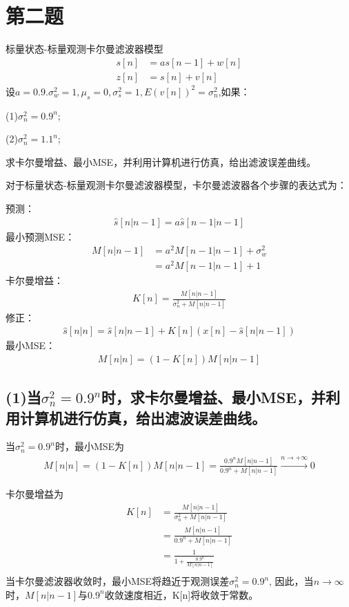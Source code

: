 \documentclass[fontset=windows]{article}
\numberwithin{figure}{section}
\begin{document}
\section{第二题}
标量状态-标量观测卡尔曼滤波器模型
\begin{align*}
    s[n] & =as[n-1]+w[n] \\
    z[n] & =s[n]+v[n]
\end{align*}
设\(a=0.9.\sigma_w^2=1,\mu_s=0,\sigma_s^2=1,E(v[n])^2=\sigma_n^2\),如果：

(1)\(\sigma_n^2=0.9^n\);

(2)\(\sigma_n^2=1.1^n\);

求卡尔曼增益、最小MSE，并利用计算机进行仿真，给出滤波误差曲线。

对于标量状态-标量观测卡尔曼滤波器模型，卡尔曼滤波器各个步骤的表达式为：

预测：
\begin{align*}
    \hat{s}[n|n-1] =a\hat{s}[n-1|n-1]
\end{align*}
最小预测MSE：
\begin{align*}
    M[n|n-1] & =a^2M[n-1|n-1]+\sigma_w^2 \\
             & =a^2M[n-1|n-1]+1
\end{align*}
卡尔曼增益：
\begin{align*}
    K[n]         =\frac{M[n|n-1]}{\sigma_n^2+M[n|n-1]}
\end{align*}
修正：
\begin{align*}
    \hat{s}[n|n] =\hat{s}[n|n-1]+K[n](x[n]-\hat{s}[n|n-1])
\end{align*}
最小MSE：
\begin{align*}
    M[n|n]       =(1-K[n])M[n|n-1]
\end{align*}

\subsection*{(1)当\(\sigma_n^2=0.9^n\)时，求卡尔曼增益、最小MSE，并利用计算机进行仿真，给出滤波误差曲线。}

当\(\sigma_n^2=0.9^n\)时，最小MSE为
\begin{align*}
    M[n|n]=(1-K[n])M[n|n-1]=\frac{0.9^nM[n|n-1]}{0.9^n+M[n|n-1]}
    \overset{n\to +\infty}{\to} 0
\end{align*}

卡尔曼增益为
\begin{align*}
    K[n] & =\frac{M[n|n-1]}{\sigma_n^2+M[n|n-1]} \\
         & =\frac{M[n|n-1]}{0.9^n+M[n|n-1]}      \\
         & = \frac{1}{1+\frac{0.9^n}{M[n|n-1]}}  \\
\end{align*}
当卡尔曼滤波器收敛时，最小MSE将趋近于观测误差\(\sigma^2_n=0.9^n\),
因此，当\(n\to \infty\)时，\(M[n|n-1]\)与\(0.9^n\)收敛速度相近，K[n]将收敛于常数。
\end{document}
